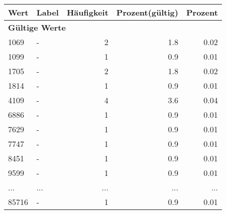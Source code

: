      \begin{longtable}{lXrrr}
     \toprule
     \textbf{Wert} & \textbf{Label} & \textbf{Häufigkeit} & \textbf{Prozent(gültig)} & \textbf{Prozent} \\
     \endhead
     \midrule
     \multicolumn{5}{l}{\textbf{Gültige Werte}}\\
        1069 & \multicolumn{1}{X}{-} & %
          \num{2} &
          \num[round-mode=places,round-precision=2]{1,8} &
          \num[round-mode=places,round-precision=2]{0,02} \\
        1099 & \multicolumn{1}{X}{-} & %
          \num{1} &
          \num[round-mode=places,round-precision=2]{0,9} &
          \num[round-mode=places,round-precision=2]{0,01} \\
        1705 & \multicolumn{1}{X}{-} & %
          \num{2} &
          \num[round-mode=places,round-precision=2]{1,8} &
          \num[round-mode=places,round-precision=2]{0,02} \\
        1814 & \multicolumn{1}{X}{-} & %
          \num{1} &
          \num[round-mode=places,round-precision=2]{0,9} &
          \num[round-mode=places,round-precision=2]{0,01} \\
        4109 & \multicolumn{1}{X}{-} & %
          \num{4} &
          \num[round-mode=places,round-precision=2]{3,6} &
          \num[round-mode=places,round-precision=2]{0,04} \\
        6886 & \multicolumn{1}{X}{-} & %
          \num{1} &
          \num[round-mode=places,round-precision=2]{0,9} &
          \num[round-mode=places,round-precision=2]{0,01} \\
        7629 & \multicolumn{1}{X}{-} & %
          \num{1} &
          \num[round-mode=places,round-precision=2]{0,9} &
          \num[round-mode=places,round-precision=2]{0,01} \\
        7747 & \multicolumn{1}{X}{-} & %
          \num{1} &
          \num[round-mode=places,round-precision=2]{0,9} &
          \num[round-mode=places,round-precision=2]{0,01} \\
        8451 & \multicolumn{1}{X}{-} & %
          \num{1} &
          \num[round-mode=places,round-precision=2]{0,9} &
          \num[round-mode=places,round-precision=2]{0,01} \\
        9599 & \multicolumn{1}{X}{-} & %
          \num{1} &
          \num[round-mode=places,round-precision=2]{0,9} &
          \num[round-mode=places,round-precision=2]{0,01} \\
       ... & ... & ... & ... & ... \\
        85716 & \multicolumn{1}{X}{-} & %
          \num{1} &
          \num[round-mode=places,round-precision=2]{0,9} &
          \num[round-mode=places,round-precision=2]{0,01} \\


\end{longtable}

